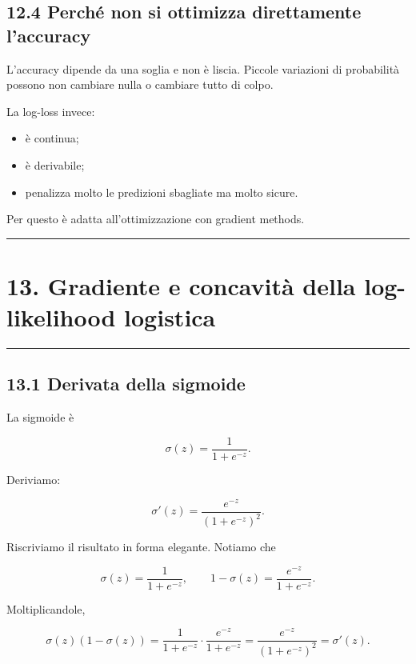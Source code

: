 \documentclass{article}
\providecommand{\tightlist}{%
  \setlength{\itemsep}{0pt}\setlength{\parskip}{0pt}}
\begin{document}
\subsection{12.4 Perché non si ottimizza direttamente
l'accuracy}\label{perchuxe9-non-si-ottimizza-direttamente-laccuracy}

L'accuracy dipende da una soglia e non è liscia. Piccole variazioni di
probabilità possono non cambiare nulla o cambiare tutto di colpo.

La log-loss invece:

\begin{itemize}
\tightlist
\item
  è continua;
\item
  è derivabile;
\item
  penalizza molto le predizioni sbagliate ma molto sicure.
\end{itemize}

Per questo è adatta all'ottimizzazione con gradient methods.

\begin{center}\rule{0.5\linewidth}{0.5pt}\end{center}

\section{13. Gradiente e concavità della log-likelihood
logistica}\label{gradiente-e-concavituxe0-della-log-likelihood-logistica}

\begin{center}\rule{0.5\linewidth}{0.5pt}\end{center}

\subsection{13.1 Derivata della sigmoide}\label{derivata-della-sigmoide}

La sigmoide è

\[
\sigma(z)=\frac{1}{1+e^{-z}}.
\]

Deriviamo:

\[
\sigma'(z)
=
\frac{e^{-z}}{(1+e^{-z})^2}.
\]

Riscriviamo il risultato in forma elegante. Notiamo che

\[
\sigma(z)=\frac{1}{1+e^{-z}},
\qquad
1-\sigma(z)=\frac{e^{-z}}{1+e^{-z}}.
\]

Moltiplicandole,

\[
\sigma(z)(1-\sigma(z))
=
\frac{1}{1+e^{-z}}
\cdot
\frac{e^{-z}}{1+e^{-z}}
=
\frac{e^{-z}}{(1+e^{-z})^2}
=
\sigma'(z).
\]
\end{document}
